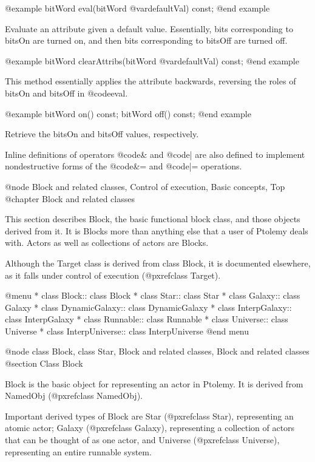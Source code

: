 @example
bitWord eval(bitWord @var{defaultVal}) const;
@end example

Evaluate an attribute given a default value.  Essentially, bits
corresponding to bitsOn are turned on, and then bits corresponding
to bitsOff are turned off.

@example
bitWord clearAttribs(bitWord @var{defaultVal}) const;
@end example

This method essentially applies the attribute backwards, reversing
the roles of bitsOn and bitsOff in @code{eval}.

@example
bitWord on() const;
bitWord off() const;
@end example

Retrieve the bitsOn and bitsOff values, respectively.

Inline definitions of operators @code{&} and @code{|} are also defined
to implement nondestructive forms of the @code{&=} and @code{|=}
operations.

@node Block and related classes, Control of execution, Basic concepts, Top
@chapter Block and related classes

This section describes Block, the basic functional block class, and
those objects derived from it.  It is Blocks more than anything else
that a user of Ptolemy deals with.  Actors as well as collections of
actors are Blocks.

Although the Target class is derived from class Block, it is documented
elsewhere, as it falls under control of execution (@pxref{class Target}).

@menu
* class Block::                 class Block
* class Star::                  class Star
* class Galaxy::                class Galaxy
* class DynamicGalaxy::         class DynamicGalaxy
* class InterpGalaxy::          class InterpGalaxy
* class Runnable::              class Runnable
* class Universe::              class Universe
* class InterpUniverse::        class InterpUniverse
@end menu

@node class Block, class Star, Block and related classes, Block and related classes
@section Class Block

Block is the basic object for representing an actor in Ptolemy.
It is derived from NamedObj (@pxref{class NamedObj}).

Important derived types of Block are Star (@pxref{class Star}),
representing an atomic actor;
Galaxy (@pxref{class Galaxy}),
representing a collection of actors that can be thought of as
one actor, and Universe (@pxref{class Universe}),
representing an entire runnable system.

